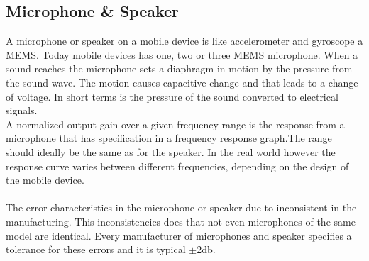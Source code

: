 \subsection{Microphone \& Speaker}\label{sec:char:micSpeak}
A microphone or speaker on a mobile device is like accelerometer and gyroscope a MEMS. Today mobile devices has one, two or three MEMS microphone. When a sound reaches the microphone sets a diaphragm in motion by the pressure from the sound wave. The motion causes capacitive change and that leads to a change of voltage. In short terms is the pressure of the sound converted to electrical signals. \cite{sensor:acoustic}\\
A normalized output gain over a given frequency range is the response from a microphone that has specification in a  frequency response graph.The range should ideally be the same as for the speaker. In the real world however the response curve varies between different frequencies, depending on the design of the mobile device.  \cite{sensor:micSpek}\\
\\ 
The error characteristics in the microphone or speaker due to inconsistent in the manufacturing. This inconsistencies does that not even microphones of the same model are identical. Every manufacturer of microphones and speaker specifies a tolerance for these errors and it is typical $\pm$2db.  \cite{sensor:micSpek}

